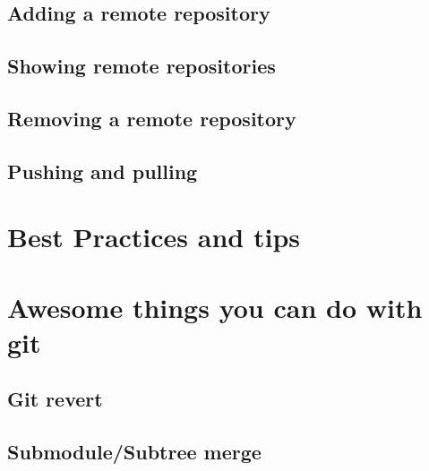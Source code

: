 \documentclass[10pt,a4paper]{beamer}
\begin{document}
\subsection{Adding a remote repository}
\begin{frame}

\end{frame}

\subsection{Showing remote repositories}
\begin{frame}

\end{frame}

\subsection{Removing a remote repository}
\begin{frame}

\end{frame}

\subsection{Pushing and pulling}
\begin{frame}

\end{frame}


\section{Best Practices and tips}
\begin{frame}

\end{frame}


\section{Awesome things you can do with git}

\subsection{Git revert}
\begin{frame}

\end{frame}

\subsection{Submodule/Subtree merge}
\begin{frame}

\end{frame}
\end{document}
